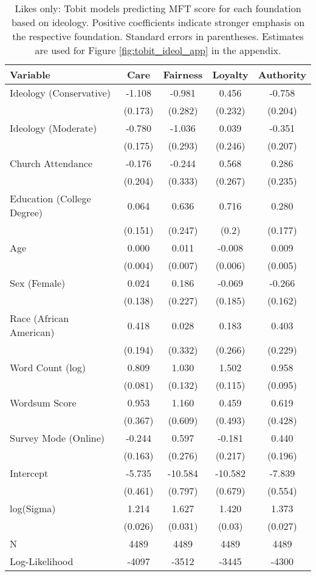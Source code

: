 \begin{table}[ht]
\centering
\caption{Likes only: Tobit models predicting MFT score for each foundation based 
           on ideology. Positive coefficients indicate stronger emphasis on the respective 
           foundation. Standard errors in parentheses. Estimates are used for 
           Figure \ref{fig:tobit_ideol_app} in the appendix.} 
\label{tab:tobit_like}
\begingroup\footnotesize
\begin{tabular}{lcccc}
  \hline
Variable & Care & Fairness & Loyalty & Authority \\ 
  \hline
Ideology (Conservative) & -1.108 &  -0.981 &   0.456 & -0.758 \\ 
   & (0.173) & (0.282) & (0.232) & (0.204) \\ 
  Ideology (Moderate) & -0.780 &  -1.036 &   0.039 & -0.351 \\ 
   & (0.175) & (0.293) & (0.246) & (0.207) \\ 
  Church Attendance & -0.176 &  -0.244 &   0.568 &  0.286 \\ 
   & (0.204) & (0.333) & (0.267) & (0.235) \\ 
  Education (College Degree) &  0.064 &   0.636 &   0.716 &  0.280 \\ 
   & (0.151) & (0.247) & (0.2) & (0.177) \\ 
  Age &  0.000 &   0.011 &  -0.008 &  0.009 \\ 
   & (0.004) & (0.007) & (0.006) & (0.005) \\ 
  Sex (Female) &  0.024 &   0.186 &  -0.069 & -0.266 \\ 
   & (0.138) & (0.227) & (0.185) & (0.162) \\ 
  Race (African American) &  0.418 &   0.028 &   0.183 &  0.403 \\ 
   & (0.194) & (0.332) & (0.266) & (0.229) \\ 
  Word Count (log) &  0.809 &   1.030 &   1.502 &  0.958 \\ 
   & (0.081) & (0.132) & (0.115) & (0.095) \\ 
  Wordsum Score &  0.953 &   1.160 &   0.459 &  0.619 \\ 
   & (0.367) & (0.609) & (0.493) & (0.428) \\ 
  Survey Mode (Online) & -0.244 &   0.597 &  -0.181 &  0.440 \\ 
   & (0.163) & (0.276) & (0.217) & (0.196) \\ 
  Intercept & -5.735 & -10.584 & -10.582 & -7.839 \\ 
   & (0.461) & (0.797) & (0.679) & (0.554) \\ 
  log(Sigma) &  1.214 &   1.627 &   1.420 &  1.373 \\ 
   & (0.026) & (0.031) & (0.03) & (0.027) \\ 
   \hline
N & 4489 & 4489 & 4489 & 4489 \\ 
  Log-Likelihood & -4097 & -3512 & -3445 & -4300 \\ 
   \hline
\end{tabular}
\endgroup
\end{table}
